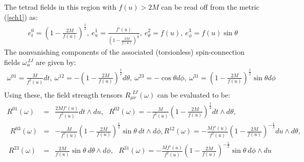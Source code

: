 \documentclass[preprint,aps,superscriptaddress,nofootinbib]{revtex4-1}
\begin{document}
The tetrad fields in this region with $f(u)>2M$ can be read off from the 
metric (\ref{sch1}) as:
\begin{eqnarray}\label{tetrad}
e^0_t=\left(1-\frac{2M}{f(u)}\right)^{\frac{1}{2}},~ e^1_u=\frac{f'(u)}
{\left(1-\frac{2M}{f(u)}\right)^{\frac{1}
{2}}},~e_\theta^2=f(u),~e^3_\phi=f(u)\sin\theta
\end{eqnarray} 
The nonvanishing components of the associated (torsionless) spin-connection 
fields $\omega_\alpha^{~IJ}$ are given by:
\begin{eqnarray}\label{omega}
\omega^{01}=\frac{M}{f^2(u)}dt,~\omega^{12}=-\left(1-\frac{2M}
{f(u)}\right)^{\frac{1}{2}} d\theta,~\omega^{23}=-\cos\theta d\phi,~
\omega^{31}=\left(1-\frac{2M}{f(u)}\right)^{\frac{1}{2}}\sin\theta 
d\phi\nonumber\\
\end{eqnarray}
Using these, the field strength tensors $R_{\mu \nu}^{~~IJ}(\omega)$ can be  
evaluated to be:
\begin{eqnarray}\label{R}
R^{01}(\omega)&=&\frac{2Mf'(u)}{f^3(u)}dt\wedge du,~~~R^{02}
(\omega)=-\frac{M}{f^2(u)}\left(1-\frac{2M}{f(u)}\right)^{\frac{1}
{2}}dt\wedge d\theta,\nonumber\\~~R^{03}(\omega)&=&-\frac{M}
{f^2(u)}\left(1-\frac{2M}{f(u)}\right)^{\frac{1}{2}}
\sin\theta ~dt\wedge d\phi,
R^{12}(\omega)=-\frac{Mf'(u)}{f^2(u)}\left(1-\frac{2M}
{f(u)}\right)^{-\frac{1}{2}}du\wedge d\theta,\nonumber\\~R^{23}(\omega)
&=& \frac{2M}{f(u)}\sin\theta ~d\theta\wedge d\phi,~~~R^{31}
(\omega)=-\frac{Mf'(u)}{f^2(u)}\left(1-\frac{2M}{f(u)}
\right)^{-\frac{1}{2}}\sin\theta~ d\phi\wedge du
\end{eqnarray}
\end{document}
